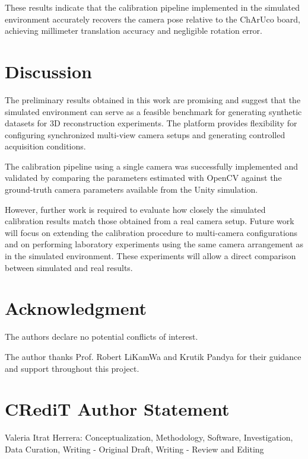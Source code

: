 \documentclass[conference]{IEEEtran}
\begin{document}
These results indicate that the calibration pipeline implemented in the simulated environment accurately recovers the camera pose relative to the ChArUco board, achieving millimeter translation accuracy and negligible rotation error.

\section{Discussion}  

The preliminary results obtained in this work are promising and suggest that the simulated environment can serve as a feasible benchmark for generating synthetic datasets for 3D reconstruction experiments. The platform provides flexibility for configuring synchronized multi-view camera setups and generating controlled acquisition conditions.

The calibration pipeline using a single camera was successfully implemented and validated by comparing the parameters estimated with OpenCV against the ground-truth camera parameters available from the Unity simulation.

However, further work is required to evaluate how closely the simulated calibration results match those obtained from a real camera setup. Future work will focus on extending the calibration procedure to multi-camera configurations and on performing laboratory experiments using the same camera arrangement as in the simulated environment. These experiments will allow a direct comparison between simulated and real results.

\section*{Acknowledgment}
The authors declare no potential conflicts of interest.

The author thanks Prof. Robert LiKamWa and Krutik Pandya for their guidance and support throughout this project.

\section*{CRediT Author Statement}
Valeria Itrat Herrera: Conceptualization, Methodology, Software, Investigation, Data Curation, Writing - Original Draft, Writing - Review and Editing



\end{document}
